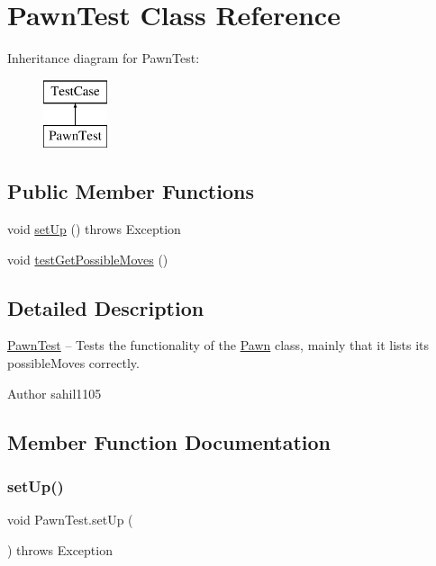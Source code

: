 \hypertarget{class_pawn_test}{}\section{Pawn\+Test Class Reference}
\label{class_pawn_test}
Inheritance diagram for Pawn\+Test\+:\begin{figure}[H]
\begin{center}
\leavevmode
\includegraphics[height=2.000000cm]{class_pawn_test}
\end{center}
\end{figure}
\subsection*{Public Member Functions}
\begin{DoxyCompactItemize}
\item 
void \mbox{\hyperlink{class_pawn_test_aaa09d09a0b5df252d265c5f44bbea650}{set\+Up}} ()  throws Exception 
\item 
void \mbox{\hyperlink{class_pawn_test_a2d7ccbcea2dc38ab62a43f4b0f1fc01b}{test\+Get\+Possible\+Moves}} ()
\end{DoxyCompactItemize}


\subsection{Detailed Description}
\mbox{\hyperlink{class_pawn_test}{Pawn\+Test}} -- Tests the functionality of the \mbox{\hyperlink{class_pawn}{Pawn}} class, mainly that it lists its possible\+Moves correctly. \begin{DoxyAuthor}{Author}
sahil1105 
\end{DoxyAuthor}


\subsection{Member Function Documentation}
\mbox{\label{class_pawn_test_aaa09d09a0b5df252d265c5f44bbea650}} 
\subsubsection{\texorpdfstring{set\+Up()}{setUp()}}
{\footnotesize\ttfamily void Pawn\+Test.\+set\+Up (\begin{DoxyParamCaption}{ }\end{DoxyParamCaption}) throws Exception}

